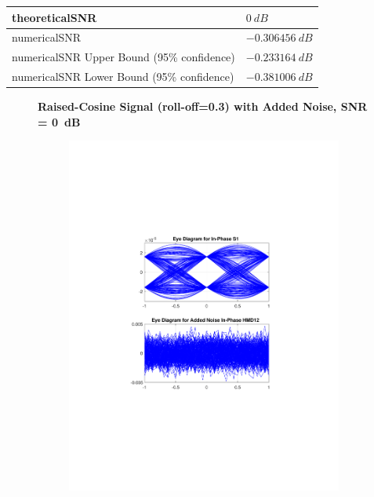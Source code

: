 \begin{refsection}
\begin{table}[H]
\begin{tabular}{|l|l|}
						theoreticalSNR  	   & $0~dB$                             					\\ \hline
		numericalSNR 		     & $-0.306456~dB$                             					\\ \hline
		numericalSNR Upper Bound (95\% confidence) & $-0.233164~dB$                             					\\ \hline
		numericalSNR Lower Bound (95\% confidence) & $-0.381006~dB$                             					\\ \hline
	\end{tabular}
\end{table}
\begin{figure}[H]
		\centering
	\textbf{Raised-Cosine Signal (roll-off=0.3) with Added Noise, SNR = 0~dB}
	\begin{minipage}{\linewidth}
		\centering
	\begin{subfigure}{.45\textwidth}
		\centering
		\includegraphics[clip, trim=5cm 7cm 5cm 7cm, width=\textwidth]{./sdf/m_qam_system/figures/eyes/if_n_nmf_60_60_rc_03.pdf}

\end{subfigure}
\end{minipage}
\end{figure}
\end{refsection}
